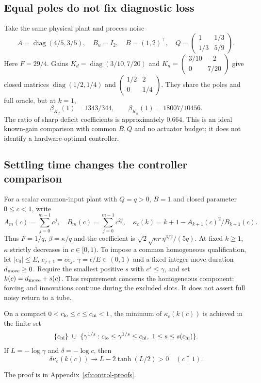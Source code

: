 \subsection{Equal poles do not fix diagnostic loss}
Take the same physical plant and process noise
\[
A=\operatorname{diag}(4/5,3/5),\quad B_u=I_2,\quad B=(1,2)^\top,
\quad Q=\begin{pmatrix}1&1/3\\1/3&5/9\end{pmatrix}.
\]
Here $F=29/4$. Gains
$K_d=\operatorname{diag}(3/10,7/20)$ and
$K_n=\left(\begin{smallmatrix}3/10&-2\\0&7/20\end{smallmatrix}\right)$
give closed matrices $\operatorname{diag}(1/2,1/4)$ and
$\left(\begin{smallmatrix}1/2&2\\0&1/4\end{smallmatrix}\right)$.
They share the poles and full oracle, but at $k=1$,
\[
\beta_{K_d}(1)=1343/344,\qquad \beta_{K_n}(1)=18007/10456.
\]
The ratio of sharp deficit coefficients is approximately $0.664$.
This is an ideal known-gain comparison with common $B,Q$ and no actuator
budget; it does not identify a hardware-optimal controller.

\subsection{Settling time changes the controller comparison}
For a scalar common-input plant with $Q=q>0$, $B=1$ and closed parameter
$0\le c<1$, write
\[
A_m(c)=\sum_{j=0}^{m-1}c^j,\quad B_m(c)=\sum_{j=0}^{m-1}c^{2j},
\quad \kappa_c(k)=k+1-A_{k+1}(c)^2/B_{k+1}(c).
\]
Thus $F=1/q$, $\beta=\kappa/q$ and the coefficient is
$\sqrt{2}\sqrt{\kappa r}\eta^{3/2}/(5q)$.
At fixed $k\ge1$, $\kappa$ strictly decreases in $c\in[0,1)$.
To impose a common homogeneous qualification, let $|e_0|\le E$,
$e_{j+1}=ce_j$, $\gamma=\epsilon/E\in(0,1)$ and a fixed integer
move duration $d_{\rm move}\ge0$. Require the smallest positive $s$ with
$c^s\le\gamma$, and set $k(c)=d_{\rm move}+s(c)$.
This requirement concerns the homogeneous component; forcing and innovations
continue during the excluded slots. It does not assert full noisy return to a tube.

\begin{proposition}\label{sf:settling}
On a compact $0<c_{\rm lo}\le c\le c_{\rm hi}<1$, the minimum of
$\kappa_c(k(c))$ is achieved in the finite set
\[
\{c_{\rm hi}\}\ \cup\
\{\gamma^{1/s}:c_{\rm lo}\le\gamma^{1/s}\le c_{\rm hi},
\ 1\le s\le s(c_{\rm hi})\}.
\]
If $L=-\log\gamma$ and $\delta=-\log c$, then
\[
\delta\kappa_c(k(c))\longrightarrow L-2\tanh(L/2)>0
\quad(c\uparrow1).
\]
\end{proposition}
The proof is in Appendix~\ref{sf:control-proofs}.

